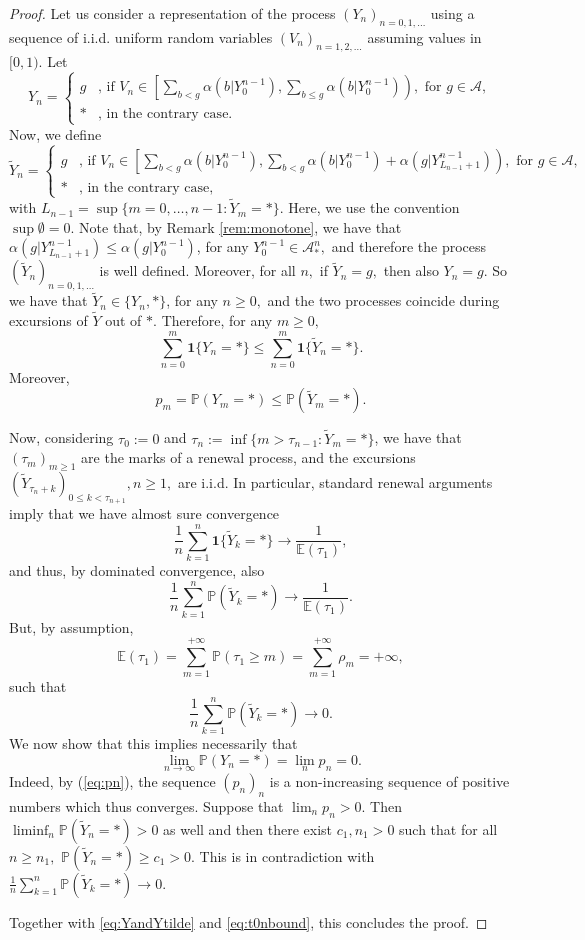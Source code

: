 \documentclass[a4paper]{article}
\def\P{{\mathbb P}}
\newcommand{\E}{\mathbb{E}}
\newcommand{\A}{\mathcal{A}}
\begin{document}
\begin{proof}
Let us consider a representation of the process $(Y_n)_{n=0,1,\ldots}$ using a sequence of i.i.d. uniform random variables $(V_n)_{n=1,2,\ldots}$ assuming values in $[0,1)$. Let
$$
Y_n=
\begin{cases}
g &\text{, if } V_n \in \left[\sum_{b<g}\alpha(b|Y_0^{n-1}),\sum_{b\leq g}\alpha(b|Y_0^{n-1})\right), \text{ for } g\in \A, \\
* &\text{, in the contrary case}.
\end{cases}
$$
Now, we define 
$$
\tilde{Y}_n=
\begin{cases}
g &\text{, if } V_n \in \left[\sum_{b<g}\alpha(b|Y_{0}^{n-1}),\sum_{b<g}\alpha(b|Y_{0}^{n-1})+ \alpha(g|Y_{L_{n-1}+1}^{n-1})\right), \text{ for } g\in \A, \\
* &\text{, in the contrary case},
\end{cases}
$$
with $L_{n-1}=\sup\{m=0,\ldots,n-1: \tilde Y_m=*\}$. Here, we use the convention $\sup\emptyset=0$. Note that, by Remark \ref{rem:monotone}, we have that $\alpha(g|Y_{L_{n-1}+1}^{n-1})\leq \alpha(g|Y_{0}^{n-1})$, for any $Y_{0}^{n-1} \in \A_*^n,$ and therefore the process $(\tilde{Y}_n)_{n=0,1,\ldots}$ is well defined. Moreover, for all $n,$ if $ \tilde Y_n = g, $ then also $ Y_n = g.$ So we have that $\tilde{Y}_n \in \{Y_n,*\}$, for any $n \geq 0,$ and the two processes coincide during excursions of $ \tilde Y$ out of $*.$ Therefore, for any $m \geq 0, $
$$
\sum_{n=0}^m \mathbf{1}\{Y_n=*\} \leq \sum_{n=0}^m \mathbf{1}\{\tilde{Y}_n=*\}.
$$
Moreover,
\begin{equation}\label{eq:YandYtilde}
p_m=\P(Y_m=*)\leq \P(\tilde{Y}_m=*).
\end{equation}

Now, considering $\tau_0:=0$ and $\tau_n:=\inf\{m>\tau_{n-1}:\tilde{Y}_m=*\}$, we have that $(\tau_m)_{m\geq 1}$ are the marks of a renewal process, and the excursions $( \tilde Y_{ \tau_n + k })_{ 0 \le k < \tau_{n+1} } , n \geq 1, $ are i.i.d. In particular, standard renewal arguments imply that we have almost sure convergence 
$$ \frac1n \sum_{k=1}^n  \mathbf{1}\{\tilde{Y}_k=*\} \to \frac{1}{\E ( \tau_1)},$$
and thus, by dominated convergence, also 
$$ \frac1n \sum_{k=1}^n  \P(\tilde{Y}_k=*) \to  \frac{1}{\E ( \tau_1)}.$$ 
But, by assumption,
$$
\E(\tau_1)=\sum_{m=1}^{+\infty} \P(\tau_1\geq m)=\sum_{m=1}^{+\infty} \rho_m=+\infty ,
$$
such that 
$$ \frac1n \sum_{k=1}^n  \P(\tilde{Y}_k=*) \to  0.$$ 
We now show that this implies necessarily that $$
\lim_{n\to \infty}\P({Y}_n=*) = \lim_n p_n = 0.
$$
Indeed, by (\ref{eq:pn}), the sequence $ (p_n)_n$ is a non-increasing sequence of positive numbers which thus converges. Suppose that $ \lim_n p_n > 0.$ Then $ \liminf_n \P(\tilde{Y}_n=*) > 0 $ as well and then there exist $ c_1, n_1 > 0 $ such that for all $ n \geq n_1, $ $ \P(\tilde{Y}_n=*) \geq c_1 > 0.$ This is in contradiction with $ \frac1n \sum_{k=1}^n  \P(\tilde{Y}_k=*) \to  0.$ 

Together with \eqref{eq:YandYtilde} and \eqref{eq:t0nbound}, this concludes the proof.
\end{proof}
\end{document}
